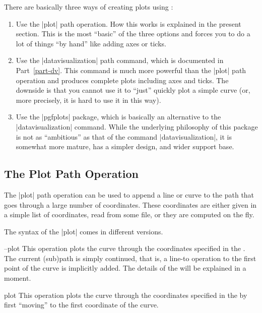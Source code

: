 There are basically three ways of creating plots using \tikzname:
%
\begin{enumerate}
    \item Use the |plot| path operation. How this works is explained in the
        present section. This is the most ``basic'' of the three options and
        forces you to do a lot of things ``by hand'' like adding axes or ticks.
    \item Use the |datavisualization| path command, which is documented in
        Part~\ref{part-dv}. This command is much more powerful than the |plot|
        path operation and produces complete plots including axes and ticks.
        The downside is that you cannot use it to ``just'' quickly plot a
        simple curve (or, more precisely, it is hard to use it in this way).
    \item Use the |pgfplots| package, which is basically an alternative to the
        |datavisualization| command. While the underlying philosophy of this
        package is not as ``ambitious'' as that of the command
        |datavisualization|, it is somewhat more mature, has a simpler design,
        and wider support base.
\end{enumerate}


\subsection{The Plot Path Operation}

The |plot| path operation can be used to append a line or curve to the path
that goes through a large number of coordinates. These coordinates are either
given in a simple list of coordinates, read from some file, or they are
computed on the fly.

The syntax of the |plot| comes in different versions.

\begin{pathoperation}{--plot}{}
    This operation plots the curve through the coordinates specified in the
    . The current (sub)path is simply continued, that
    is, a line-to operation to the first point of the curve is implicitly
    added. The details of the  will be explained in a
    moment.
\end{pathoperation}

\begin{pathoperation}{plot}{}
    This operation plots the curve through the coordinates specified in the
     by first ``moving'' to the first coordinate of the
    curve.
\end{pathoperation}

